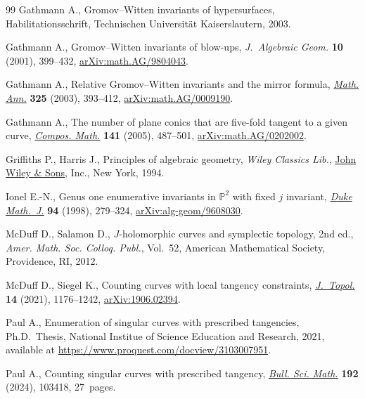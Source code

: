 \documentclass[pdftex]{sigma}
\numberwithin{equation}{section}
\begin{document}
\begin{thebibliography}{99}
Gathmann A., {G}romov--{W}itten invariants of hypersurfaces,
 {H}abilitationsschrift, {T}echnischen {U}niversit\"at {K}aiserslautern, 2003.

Gathmann A., Gromov--{W}itten invariants of blow-ups, \textit{J.~Algebraic
 Geom.} \textbf{10} (2001), 399--432, \href{https://arxiv.org/abs/math.AG/9804043}{arXiv:math.AG/9804043}.

Gathmann A., Relative {G}romov--{W}itten invariants and the mirror formula,
 \href{https://doi.org/10.1007/s00208-002-0345-1}{\textit{Math. Ann.}} \textbf{325} (2003), 393--412, \href{https://arxiv.org/abs/math.AG/0009190}{arXiv:math.AG/0009190}.

Gathmann A., The number of plane conics that are five-fold tangent to a given
 curve, \href{https://doi.org/10.1112/S0010437X04001083}{\textit{Compos. Math.}} \textbf{141} (2005), 487--501,
 \href{https://arxiv.org/abs/math.AG/0202002}{arXiv:math.AG/0202002}.

Griffiths P., Harris J., Principles of algebraic geometry, \textit{Wiley Classics Lib.},
  \href{https://doi.org/10.1002/9781118032527}{John Wiley \& Sons}, Inc., New York, 1994.

Ionel E.-N., Genus one enumerative invariants in {$\mathbb P^2$} with fixed $j$
 invariant, \href{https://doi.org/10.1215/S0012-7094-98-09414-5}{\textit{Duke Math.~J.}} \textbf{94} (1998), 279--324,
 \href{https://arxiv.org/abs/alg-geom/9608030}{arXiv:alg-geom/9608030}.

McDuff D., Salamon D., {$J$}-holomorphic curves and symplectic topology, 2nd ed.,
 \textit{Amer. Math. Soc. Colloq. Publ.}, Vol.~52, American
 Mathematical Society, Providence, RI, 2012.

McDuff D., Siegel K., Counting curves with local tangency constraints,
 \href{https://doi.org/10.1112/topo.12204}{\textit{J.~Topol.}} \textbf{14} (2021), 1176--1242, \href{https://arxiv.org/abs/1906.02394}{arXiv:1906.02394}.

Paul A., Enumeration of singular curves with prescribed tangencies, Ph.D.~Thesis, {N}ational {I}nstitue of Science Education and Research, 2021, available at \url{https://www.proquest.com/docview/3103007951}.

Paul A., Counting singular curves with prescribed tangency,  \href{https://doi.org/10.1016/j.bulsci.2024.103418}{\textit{Bull. Sci.
 Math.}} \textbf{192} (2024), 103418, 27~pages.

\end{thebibliography}\LastPageEnding
\end{document}
